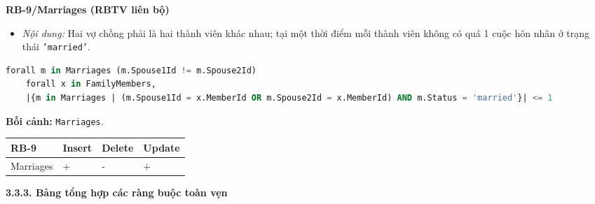 \vspace{1.0em}
\textbf{RB-9/Marriages (RBTV liên bộ)}
\begin{itemize}
	\item \emph{Nội dung:} Hai vợ chồng phải là hai thành viên khác nhau; tại một thời điểm mỗi thành viên không có quá 1 cuộc hôn nhân ở trạng thái \texttt{'married'}.
\end{itemize}

\begin{lstlisting}[language=SQL]
	forall m in Marriages (m.Spouse1Id != m.Spouse2Id)
	forall x in FamilyMembers,
	|{m in Marriages | (m.Spouse1Id = x.MemberId OR m.Spouse2Id = x.MemberId) AND m.Status = 'married'}| <= 1
\end{lstlisting}
\noindent\textbf{Bối cảnh:} \texttt{Marriages}.

\vspace{0.4em}
{\centering
	\renewcommand{\arraystretch}{1.2}
	\begin{tabular}{|>{\raggedright\arraybackslash}p{}|>{\centering\arraybackslash}p{}|>{\centering\arraybackslash}p{}|>{\centering\arraybackslash}p{}|}
		\hline
		\textbf{RB-9} & \textbf{Insert} & \textbf{Delete} & \textbf{Update} \\ \hline
		Marriages & + & - & + \\ \hline
	\end{tabular}\par}

\vspace{1.4em}
{}
{\large\bfseries 3.3.3. Bảng tổng hợp các ràng buộc toàn vẹn}\par\vspace{0.6em}

